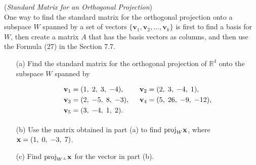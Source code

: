 \begin{exer}(\textit{Standard Matrix for an Orthogonal Projection})\\
One way to find the standard matrix for the orthogonal projection onto a subspace $W$ spanned by a set of vectors $\{\mathbf{v}_{1}, \mathbf{v}_{2}, ..., \mathbf{v}_{k}\}$ is first to find a basis for $W$, then create a matrix $A$ that has the basis vectors as columns, and then use the Formula (27) in the Section 7.7.

\vspace{2mm}

\begin{enumerate}

\item[(a)] Find the standard matrix for the orthogonal projection of $\mathbb{R}^{4}$ onto the subspace $W$ spanned by

\begin{displaymath}
\begin{array}{ll} \vspace{1mm} \mathbf{v}_{1} = (1, \hspace{1mm} 2, \hspace{1mm} 3, \hspace{1mm} -4), & \hspace{2mm} \mathbf{v}_{2} = (2, \hspace{1mm}3, \hspace{1mm} -4, \hspace{1mm} 1), \\ \vspace{1mm} \mathbf{v}_{3} = (2, \hspace{1mm} -5, \hspace{1mm} 8, \hspace{1mm} -3), & \hspace{2mm} \mathbf{v}_{4} = (5, \hspace{1mm} 26, \hspace{1mm} -9, \hspace{1mm} -12), \\ \vspace{1mm} \mathbf{v}_{5} = (3, \hspace{1mm} -4, \hspace{1mm} 1, \hspace{1mm} 2). \end{array}
\end{displaymath}

\vspace{1mm}

\item[(b)] Use the matrix obtained in part (a) to find $\mathrm{proj}_{\tiny{W}} \mathbf{x}$, where $\mathbf{x} = (1, \hspace{1mm} 0, \hspace{1mm} -3, \hspace{1mm} 7)$.

\vspace{3mm}

\item[(c)] Find $\mathrm{proj}_{\tiny{W^{\perp}}} \mathbf{x}$ for the vector in part (b).

\end{enumerate}
\end{exer}

